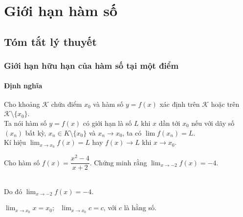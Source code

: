 \section{Giới hạn hàm số}
\subsection{Tóm tắt lý thuyết}
\subsubsection{Giới hạn hữu hạn của hàm số tại một điểm}
\paragraph{Định nghĩa}
\begin{dn}
Cho khoảng $\mathscr{K}$ chứa điểm $x_0$ và hàm số $y=f(x)$ xác định trên $\mathscr{K}$ hoặc trên $\mathscr{K}\setminus \{x_0\}$.\\
Ta nói hàm số $y = f(x)$ có giới hạn là số $L$ khi $x$ dần tới $x_0$ nếu với dãy số $(x_n)$ bất kỳ, $x_n\in K\setminus \{x_0\}$ và $x_n\to x_0$, ta có $\displaystyle\lim f(x_n)=L$.\\
Kí hiệu $\displaystyle\lim_{x\to x_0} f(x)=L$ hay $f(x)\rightarrow L$ khi $x \rightarrow x_0$.
\end{dn}
\begin{vd}%
Cho hàm số $f(x) = \dfrac{x^2 - 4}{x + 2}$. Chứng minh rằng $\displaystyle\lim_{x\to -2} f(x)= -4$.
\end{vd}
 \\
Do đó $\displaystyle \lim_{x \to -2} f(x) = -4$.
\begin{note}
$\displaystyle \lim_{x \to x_0}x = x_0; \text{ }\displaystyle \lim_{x \to x_0} c = c$, với $c$ là hằng số. 
\end{note}
